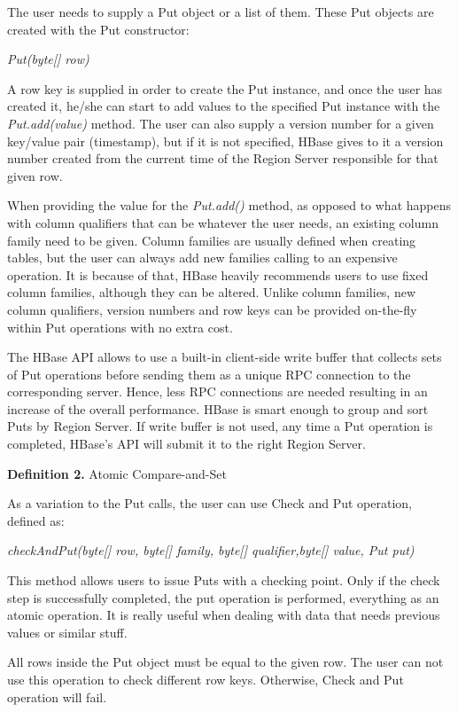 The user needs to supply a Put object or a list of them. These Put objects are created with the Put constructor:
\par
\bigskip
\centerline{\textit{Put(byte[] row)}}
\bigskip
A row key is supplied in order to create the Put instance, and once the user has created it, he/she can start to add values to the specified Put instance with the \textit{Put.add(value)} method. The user can also supply a version number for a given key/value pair (timestamp), but if it is not specified, HBase gives to it a version number created from the current time of the Region Server responsible for that given row.
\par
When providing the value for the \textit{Put.add()} method, as opposed to what happens with column qualifiers that can be whatever the user needs, an existing column family need to be given. Column families are usually defined when creating tables, but the user can always add new families calling to an expensive operation. It is because of that, HBase heavily recommends users to use fixed column families, although they can be altered.
Unlike column families, new column qualifiers, version numbers and row keys can be provided on-the-fly within Put operations with no extra cost.
\par
The HBase API allows to use a built-in client-side write buffer that collects sets of Put operations before sending them as a unique RPC connection to the corresponding server. Hence, less RPC connections are needed resulting in an increase of the overall performance. HBase is smart enough to group and sort Puts by Region Server. If write buffer is not used,  any time a Put operation is completed, HBase's API will submit it to the right Region Server.

\bigskip
\textbf{Definition 2. }Atomic Compare-and-Set

As a variation to the Put calls, the user can use Check and Put operation, defined as:
\par
\bigskip
\centerline{\textit{checkAndPut(byte[] row, byte[] family, byte[] qualifier,byte[] value, Put put)}}
\bigskip
This method allows users to issue Puts with a checking point. Only if the check step is successfully completed, the put operation is performed, everything as an atomic operation. It is really useful when dealing with data that needs previous values or similar stuff.
\par
All rows inside the Put object must be equal to the given row. The user can not use this operation to check different row keys. Otherwise, Check and Put operation will fail.

